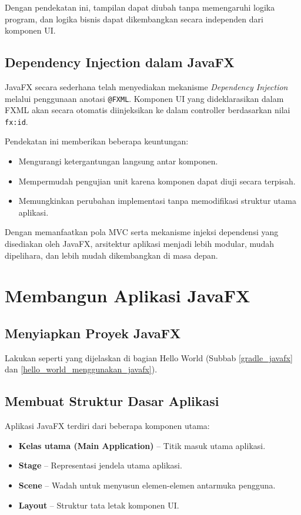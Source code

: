 Dengan pendekatan ini, tampilan dapat diubah tanpa memengaruhi logika program, dan logika bisnis dapat dikembangkan secara independen dari komponen UI.

\subsection{Dependency Injection dalam JavaFX}

JavaFX secara sederhana telah menyediakan mekanisme \textit{Dependency Injection} melalui penggunaan anotasi \texttt{@FXML}. Komponen UI yang dideklarasikan dalam FXML akan secara otomatis diinjeksikan ke dalam controller berdasarkan nilai \texttt{fx:id}.

Pendekatan ini memberikan beberapa keuntungan:

\begin{itemize}
\item Mengurangi ketergantungan langsung antar komponen.
\item Mempermudah pengujian unit karena komponen dapat diuji secara terpisah.
\item Memungkinkan perubahan implementasi tanpa memodifikasi struktur utama aplikasi.
\end{itemize}

Dengan memanfaatkan pola MVC serta mekanisme injeksi dependensi yang disediakan oleh JavaFX, arsitektur aplikasi menjadi lebih modular, mudah dipelihara, dan lebih mudah dikembangkan di masa depan.



\section{Membangun Aplikasi JavaFX}

\subsection{Menyiapkan Proyek JavaFX}

Lakukan seperti yang dijelaskan di bagian Hello World (Subbab \ref{gradle_javafx} dan \ref{hello_world_menggunakan_javafx}).

\subsection{Membuat Struktur Dasar Aplikasi}

Aplikasi JavaFX terdiri dari beberapa komponen utama:
\begin{itemize}
\item \textbf{Kelas utama (Main Application)} – Titik masuk utama aplikasi.
\item \textbf{Stage} – Representasi jendela utama aplikasi.
\item \textbf{Scene} – Wadah untuk menyusun elemen-elemen antarmuka pengguna.
\item \textbf{Layout} – Struktur tata letak komponen UI.
\end{itemize}



